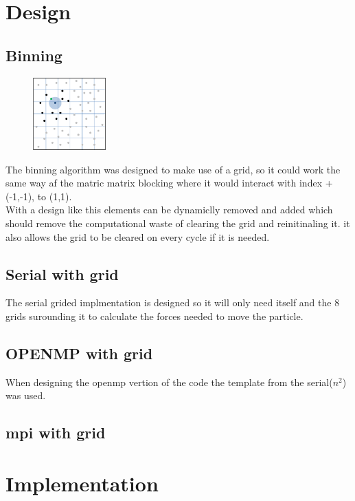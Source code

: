 \documentclass[a4paper,10pt,titlepage]{report}
\begin{document}
\section{Design}

\subsection{Binning}
\begin{figure} %
    \centering
    \includegraphics[width=0.25\textwidth]{grid.png}
\end{figure}
The binning algorithm was designed to make use of a grid, so it could work the same way af the matric matrix blocking where it would interact with index +(-1,-1), to (1,1). \\

With a design like this elements can be dynamiclly removed and added which should remove the computational waste of clearing the grid and reinitinaling it. it also allows the grid to be cleared on every cycle if it is needed. \\

\subsection{Serial with grid}
The serial grided implmentation is designed so it will only need itself and the 8 grids surounding it to calculate the forces needed to move the particle.

\subsection{OPENMP with grid}
When designing the openmp vertion of the code the template from the serial($n^2$) was used.

\subsection{mpi with grid}




\section{Implementation}
\end{document}
